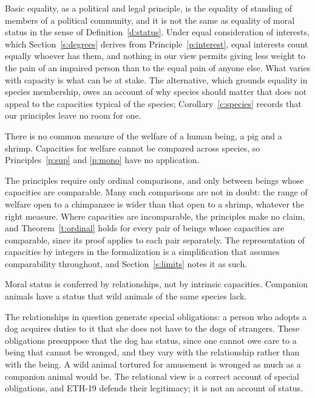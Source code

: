 \documentclass{situationist-preprint}
\begin{document}
\begin{reply}
Basic equality, as a political and legal principle, is the equality of standing of members of a political community, and it is not the same as equality of moral status in the sense of Definition~\ref{d:status}. Under equal consideration of interests, which Section~\ref{s:degrees} derives from Principle~\ref{p:interest}, equal interests count equally whoever has them, and nothing in our view permits giving less weight to the pain of an impaired person than to the equal pain of anyone else. What varies with capacity is what can be at stake. The alternative, which grounds equality in species membership, owes an account of why species should matter that does not appeal to the capacities typical of the species; Corollary~\ref{c:species} records that our principles leave no room for one.
\end{reply}

\begin{objection}[Incommensurability]
There is no common measure of the welfare of a human being, a pig and a shrimp. Capacities for welfare cannot be compared across species, so Principles~\ref{p:sup} and \ref{p:mono} have no application.
\end{objection}

\begin{reply}
The principles require only ordinal comparisons, and only between beings whose capacities are comparable. Many such comparisons are not in doubt: the range of welfare open to a chimpanzee is wider than that open to a shrimp, whatever the right measure. Where capacities are incomparable, the principles make no claim, and Theorem~\ref{t:ordinal} holds for every pair of beings whose capacities are comparable, since its proof applies to each pair separately. The representation of capacities by integers in the formalization is a simplification that assumes comparability throughout, and Section~\ref{s:limits} notes it as such.
\end{reply}

\begin{objection}
Moral status is conferred by relationships, not by intrinsic capacities. Companion animals have a status that wild animals of the same species lack.
\end{objection}

\begin{reply}
The relationships in question generate special obligations: a person who adopts a dog acquires duties to it that she does not have to the dogs of strangers. These obligations presuppose that the dog has status, since one cannot owe care to a being that cannot be wronged, and they vary with the relationship rather than with the being. A wild animal tortured for amusement is wronged as much as a companion animal would be. The relational view is a correct account of special obligations, and ETH-19 defends their legitimacy; it is not an account of status.
\end{reply}
\end{document}
